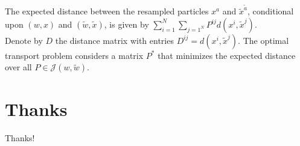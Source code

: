 \documentclass[table]{beamer}
\begin{document}
\begin{CJK}{UTF8}{gbsn}
\begin{frame}
The expected distance between the resampled particles $x^a$ and $\tilde{x}^{\tilde{a}}$, conditional upon $(w,x)$ and $(\tilde{w},\tilde{x})$, is given by $\sum_{i=1}^N \sum_{j=1^N} P^{ij}d(x^i,\tilde{x}^j)$. \\

Denote by $D$ the distance matrix with entries $D^{ij} = d(x^i,\tilde{x}^j)$. The optimal transport problem considers a matrix $P^*$ that minimizes the expected distance over all $P \in \mathcal{J}(w,\tilde{w})$.
\end{frame}


\section*{Thanks}
\begin{frame}
\centering Thanks!
\end{frame}

\end{CJK}
\end{document}
